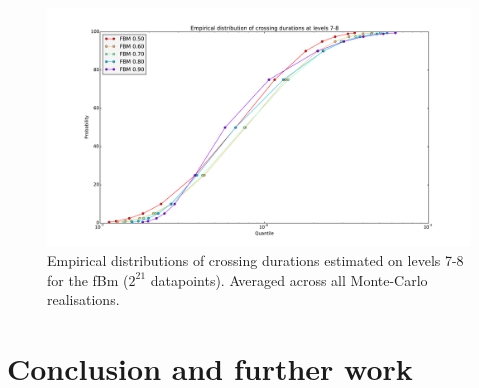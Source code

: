\documentclass[a4paper]{article}
\begin{document}
\begin{figure}[htb]\begin{center}
    \includegraphics[width=6in]{images/fig_10_med_FBM}
    \caption{Empirical distributions of crossing durations estimated on levels 7-8
    for the fBm ($2^{21}$ datapoints). Averaged across all Monte-Carlo realisations.}
\label{fig:fbm_quantiles_durations}
\end{center}\end{figure}



\section{Conclusion and further work} %
\label{sec:conlusion_and_further_work}
\end{document}
